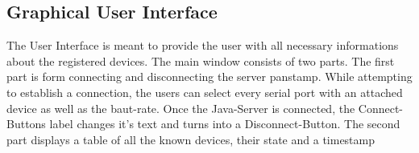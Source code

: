 \subsection{Graphical User Interface}
The User Interface is meant to provide the user with all necessary informations about the registered devices. The main window consists of two parts. 
The first part is form connecting and disconnecting the server panstamp. While attempting to establish a connection, the users can select every serial port with an attached device as well as the baut-rate. Once the Java-Server is connected, the Connect-Buttons label changes it's text and turns into a Disconnect-Button.
The second part displays a table of all the known devices, their state and a timestamp 
